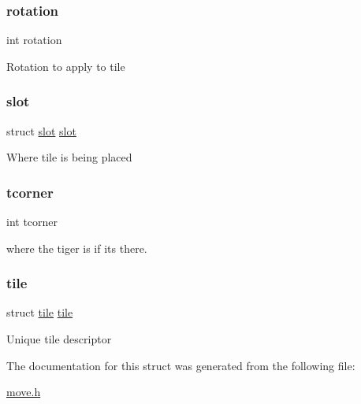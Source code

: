\subsubsection{\texorpdfstring{rotation}{rotation}}
{\footnotesize\ttfamily int rotation}

Rotation to apply to tile \hypertarget{structmove_a70dfb84f3ffd473f5e7c321b4f7a482a}{}\label{structmove_a70dfb84f3ffd473f5e7c321b4f7a482a} 
\subsubsection{\texorpdfstring{slot}{slot}}
{\footnotesize\ttfamily struct \hyperlink{structslot}{slot} \hyperlink{structslot}{slot}}

Where tile is being placed \hypertarget{structmove_ac450a71debd7858b736e4972e986a399}{}\label{structmove_ac450a71debd7858b736e4972e986a399} 
\subsubsection{\texorpdfstring{tcorner}{tcorner}}
{\footnotesize\ttfamily int tcorner}

where the tiger is if it\textquotesingle{}s there. \hypertarget{structmove_af4c27cc487c857e8a76e4ed6f38dd351}{}\label{structmove_af4c27cc487c857e8a76e4ed6f38dd351} 
\subsubsection{\texorpdfstring{tile}{tile}}
{\footnotesize\ttfamily struct \hyperlink{structtile}{tile} \hyperlink{structtile}{tile}}

Unique tile descriptor 

The documentation for this struct was generated from the following file\+:\begin{DoxyCompactItemize}
\item 
\hyperlink{move_8h}{move.\+h}\end{DoxyCompactItemize}
